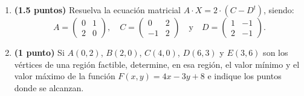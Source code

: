 
\begin{enumerate}[label=\alph*)]
\item \textbf{(1.5 puntos)} Resuelva la ecuación matricial $A\cdot X=2\cdot(C-D^t)$, siendo:
\[
A=\begin{pmatrix}0&1\\2&0\end{pmatrix},\quad C=\begin{pmatrix}0&2\\-1&2\end{pmatrix}\quad\text{y}\quad D=\begin{pmatrix}1&-1\\2&-1\end{pmatrix}.
\]
\item \textbf{(1 punto)} Si $A(0,2)$, $B(2,0)$, $C(4,0)$, $D(6,3)$ y $E(3,6)$ son los vértices de una región factible, determine, en esa región, el valor mínimo y el valor máximo de la función $F(x,y)=4x-3y+8$ e indique los puntos donde se alcanzan.
\end{enumerate}
